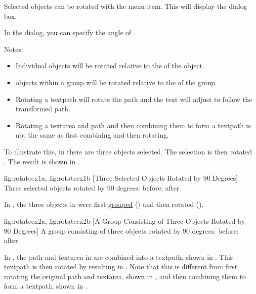 Selected \glspl{object} can be rotated with the
 menu item. This will display the
 dialog box.


In the  dialog,
you can specify the angle of
.

Notes:
\begin{itemize}
\item Individual \glspl{object}
will be rotated relative to the  of the \gls{object}.

\item \Glspl*{object} within a
\gls{group} will be rotated relative to the  of the
group.

\item Rotating a \gls{textpath} will rotate the path and the text
will adjust to follow the transformed path.

\item Rotating a \gls*{textarea} and \gls*{path} and then combining
them to form a \gls*{textpath} is not the same as first combining
and then rotating.

\end{itemize}

To illustrate this, in  there are three
\glspl*{object} selected.  The selection is then rotated
.  The result is shown in .

{
 {fig:rotateex1a}{}{},
 {fig:rotateex1b}{}{}
}
[Three Selected Objects Rotated by 90 Degrees]
{Three selected objects rotated by 90 degrees: 
 before;
 after.}

In , the three objects in
 were first \hyperref[sec:grouping]{grouped}
() and then rotated 
().

{
 {fig:rotateex2a}{}{},
 {fig:rotateex2b}{}{}
}
[A Group Consisting of Three Objects Rotated by 90 Degrees]
{A group consisting of three objects rotated by 90 degrees:
 before;  after.}

In , the \gls*{path} and
\gls*{textarea} in  are
combined into a \gls*{textpath}, shown in
. This \gls*{textpath} is then
rotated by  resulting in
. Note that this is different
from first rotating the original \gls*{path} and \gls*{textarea},
shown in , and then combining
them to form a \gls*{textpath}, shown in
.

